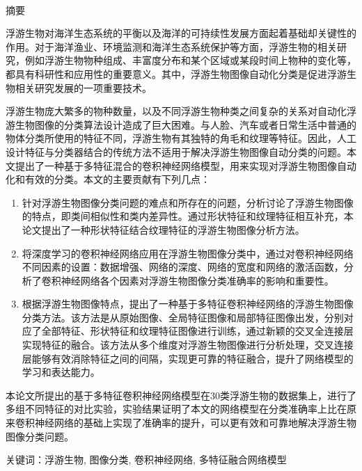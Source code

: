 \newpage

\pagestyle{plain}
\clearpage{}

\begin{center}
  {\sanhao[1.5]\heiti\oucctitle\\\vskip7pt 摘\hspace{1em}要}
\end{center}
{\normalsize\songti

  \indent
  浮游生物对海洋生态系统的平衡以及海洋的可持续性发展方面起着基础却关键性的作用。对于海洋渔业、环境监测和海洋生态系统保护等方面，浮游生物的相关研究，例如浮游生物物种组成、丰富度分布和某个区域或某段时间上物种的变化等，都具有科研性和应用性的重要意义。其中，浮游生物图像自动化分类是促进浮游生物相关研究发展的一项重要技术。

  浮游生物庞大繁多的物种数量，以及不同浮游生物种类之间复杂的关系对自动化浮游生物图像的分类算法设计造成了巨大困难。与人脸、汽车或者日常生活中普通的物体分类所使用的特征不同，浮游生物有其独特的角毛和纹理等特征。因此，人工设计特征与分类器结合的传统方法不适用于解决浮游生物图像自动分类的问题。本文提出了一种基于多特征混合的卷积神经网络模型，用来实现对浮游生物图像自动化和有效的分类。本文的主要贡献有下列几点：

\begin{enumerate}
\item 针对浮游生物图像分类问题的难点和所存在的问题，分析讨论了浮游生物图像的特点，即类间相似性和类内差异性。通过形状特征和纹理特征相互补充，本论文提出了一种形状特征结合纹理特征的浮游生物图像分析方法。%
\item 将深度学习的卷积神经网络应用在浮游生物图像分类中，通过对卷积神经网络不同因素的设置：数据增强、网络的深度、网络的宽度和网络的激活函数，分析了卷积神经网络各个因素对浮游生物图像分类准确率的影响和重要性。%
\item 根据浮游生物图像特点，提出了一种基于多特征卷积神经网络的浮游生物图像分类方法。该方法是从原始图像、全局特征图像和局部特征图像出发，分别对应了全部特征、形状特征和纹理特征图像进行训练，通过新颖的交叉全连接层实现特征的融合。该方法从多个维度对浮游生物图像进行分析处理，交叉连接层能够有效消除特征之间的间隔，实现更可靠的特征融合，提升了网络模型的学习和表达能力。%
\end{enumerate}

本论文所提出的基于多特征卷积神经网络模型在30类浮游生物的数据集上，进行了多组不同特征的对比实验，实验结果证明了本文的网络模型在分类准确率上比在原来卷积神经网络的基础上实现了准确率的提升，可以更有效和可靠地解决浮游生物图像分类问题。

}
\vskip12bp
{\xiaosi\heiti\noindent
关键词：浮游生物, 图像分类, 卷积神经网络, 多特征融合网络模型}

